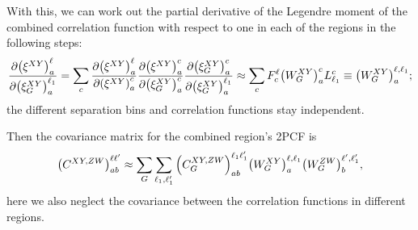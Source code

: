 With this, we can work out the partial derivative of the Legendre moment of the combined correlation function with respect to one in each of the regions in the following steps:
\begin{equation}
    \frac{\partial \qty(\xi^{XY})^\ell_a}{\partial \qty(\xi^{XY}_G)^{\ell_1}_a} = \sum_c \frac{\partial \qty(\xi^{XY})^\ell_a}{\partial \qty(\xi^{XY})^c_a} \frac{\partial \qty(\xi^{XY})^c_a}{\partial \qty(\xi^{XY}_G)^c_a} \frac{\partial \qty(\xi^{XY}_G)^c_a}{\partial \qty(\xi^{XY}_G)^{\ell_1}_a} \approx \sum_c F_c^\ell \qty(W^{XY}_G)_a^c L^c_{\ell_1} \equiv \qty(W_G^{XY})^{\ell,\ell_1}_a;
\end{equation}
the different separation bins and correlation functions stay independent.

Then the covariance matrix for the combined region's 2PCF is
\begin{align}
    \qty(C^{XY,ZW})_{ab}^{\ell\ell'} \approx \sum_G \sum_{\ell_1,\ell'_1} \qty(C^{XY,ZW}_G)_{ab}^{\ell_1\ell'_1} \qty(W^{XY}_G)_a^{\ell,\ell_1} \qty(W^{ZW}_G)_b^{\ell',\ell'_1},
\end{align}
here we also neglect the covariance between the correlation functions in different regions.